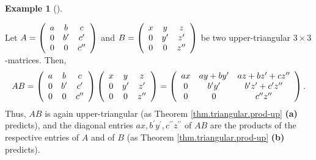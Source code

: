 \documentclass[numbers=enddot,12pt,final,onecolumn,notitlepage]{scrartcl}%
\theoremstyle{definition}
\newtheorem{exam}[theo]{Example}
\newenvironment{example}[1][]
{\begin{exam}[#1]\begin{leftbar}}
{\end{leftbar}\end{exam}}
\begin{document}
\begin{example}
Let $A=\left(
\begin{array}
[c]{ccc}%
a & b & c\\
0 & b^{\prime} & c^{\prime}\\
0 & 0 & c^{\prime\prime}%
\end{array}
\right)  $ and $B=\left(
\begin{array}
[c]{ccc}%
x & y & z\\
0 & y^{\prime} & z^{\prime}\\
0 & 0 & z^{\prime\prime}%
\end{array}
\right)  $ be two upper-triangular $3\times3$-matrices. Then,%
\[
AB=\left(
\begin{array}
[c]{ccc}%
a & b & c\\
0 & b^{\prime} & c^{\prime}\\
0 & 0 & c^{\prime\prime}%
\end{array}
\right)  \left(
\begin{array}
[c]{ccc}%
x & y & z\\
0 & y^{\prime} & z^{\prime}\\
0 & 0 & z^{\prime\prime}%
\end{array}
\right)  =\left(
\begin{array}
[c]{ccc}%
ax & ay+by^{\prime} & az+bz^{\prime}+cz^{\prime\prime}\\
0 & b^{\prime}y^{\prime} & b^{\prime}z^{\prime}+c^{\prime}z^{\prime\prime}\\
0 & 0 & c^{\prime\prime}z^{\prime\prime}%
\end{array}
\right)  .
\]
Thus, $AB$ is again upper-triangular (as Theorem \ref{thm.triangular.prod-up}
\textbf{(a)} predicts), and the diagonal entries $ax,b^{\prime}y^{\prime
},c^{\prime\prime}z^{\prime\prime}$ of $AB$ are the products of the respective
entries of $A$ and of $B$ (as Theorem \ref{thm.triangular.prod-up}
\textbf{(b)} predicts).
\end{example}
\end{document}

